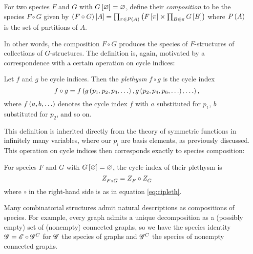\documentclass[distribution,draft]{brandiss} %
\numberwithin{section}{chapter}
\numberwithin{figure}{chapter}
\begin{document}
\begin{definition}
  \label{def:speccomp}
  For two species $F$ and $G$ with $G \left[ {\varnothing} \right] = \varnothing$, define their \emph{composition} to be the species $F \circ G$ given by $\left( {F \circ G} \right) \left[ {A} \right] = \prod_{\pi \in P \left( {A} \right)} \left( {F \left[ {\pi} \right] \times \prod_{B \in \pi} G \left[ {B} \right]} \right)$ where $P \left( {A} \right)$ is the set of partitions of $A$.
\end{definition}
In other words, the composition $F \circ G$ produces the species of $F$-structures of collections of $G$-structures.
The definition is, again, motivated by a correspondence with a certain operation on cycle indices:
\begin{definition}
  \label{def:cipleth}
  Let $f$ and $g$ be cycle indices. Then the \emph{plethysm} $f \circ g$ is the cycle index
  \begin{equation}
    \label{eq:cipleth}
    f \circ g = f \left( {g \left( {p_{1}, p_{2}, p_{3}, \dots} \right), g \left( {p_{2}, p_{4}, p_{6}, \dots} \right), \dots} \right),
  \end{equation}
  where $f \left( {a, b, \dots} \right)$ denotes the cycle index $f$ with $a$ substituted for $p_{1}$, $b$ substituted for $p_{2}$, and so on.
\end{definition}
This definition is inherited directly from the theory of symmetric functions in infinitely many variables, where our $p_{i}$ are basis elements, as previously discussed. This operation on cycle indices then corresponds exactly to species composition:
\begin{theorem}
  \label{thm:speccompci}
  For species $F$ and $G$ with $G \left[ {\varnothing} \right] = \varnothing$, the cycle index of their plethysm is
  \begin{equation}
    \label{eq:speccompci}
     Z_{F \circ G}^{}  =  Z_{F}^{}  \circ  Z_{G}^{} 
  \end{equation}
  where $\circ$ in the right-hand side is as in equation \eqref{eq:cipleth}.
\end{theorem}
Many combinatorial structures admit natural descriptions as compositions of species.
For example, every graph admits a unique decomposition as a (possibly empty) set of (nonempty) connected graphs, so we have the species identity $\mathscr{G} = \mathscr{E} \circ \mathscr{G}^{C}$ for $\mathscr{G}$ the species of graphs and $\mathscr{G}^{C}$ the species of nonempty connected graphs.
\end{document}
